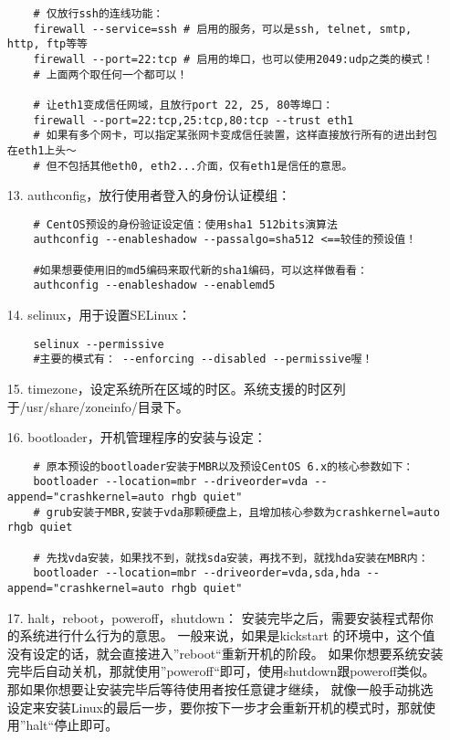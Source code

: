 \documentclass[a4paper,left=1.5cm,right=1.5cm,11pt]{article}
\begin{document}
\begin{itemize}
\begin{lstlisting}
	# 仅放行ssh的连线功能： 
	firewall --service=ssh # 启用的服务，可以是ssh, telnet, smtp, http, ftp等等 
	firewall --port=22:tcp # 启用的埠口，也可以使用2049:udp之类的模式！ 
	# 上面两个取任何一个都可以！

	# 让eth1变成信任网域，且放行port 22, 25, 80等埠口： 
	firewall --port=22:tcp,25:tcp,80:tcp --trust eth1
	# 如果有多个网卡，可以指定某张网卡变成信任装置，这样直接放行所有的进出封包在eth1上头～ 
	# 但不包括其他eth0, eth2...介面，仅有eth1是信任的意思。
		\end{lstlisting}

		\item[13.] authconfig，放行使用者登入的身份认证模组：
		\begin{lstlisting}
	# CentOS预设的身份验证设定值：使用sha1 512bits演算法
	authconfig --enableshadow --passalgo=sha512 <==较佳的预设值！ 

	#如果想要使用旧的md5编码来取代新的sha1编码，可以这样做看看： 
	authconfig --enableshadow --enablemd5
		\end{lstlisting}

		\item[14.] selinux，用于设置SELinux：
		\begin{lstlisting}
	selinux --permissive
	#主要的模式有： --enforcing --disabled --permissive喔！
		\end{lstlisting}

		\item[15.] timezone，设定系统所在区域的时区。系统支援的时区列于/usr/share/zoneinfo/目录下。
		\item[16.] bootloader，开机管理程序的安装与设定：
		\begin{lstlisting}
	# 原本预设的bootloader安装于MBR以及预设CentOS 6.x的核心参数如下：
	bootloader --location=mbr --driveorder=vda --append="crashkernel=auto rhgb quiet" 
	# grub安装于MBR,安装于vda那颗硬盘上，且增加核心参数为crashkernel=auto rhgb quiet 

	# 先找vda安装，如果找不到，就找sda安装，再找不到，就找hda安装在MBR内： 
	bootloader --location=mbr --driveorder=vda,sda,hda --append="crashkernel=auto rhgb quiet"
		\end{lstlisting}

		\item[17.] halt，reboot，poweroff，shutdown：
		安装完毕之后，需要安装程式帮你的系统进行什么行为的意思。 
		一般来说，如果是kickstart 的环境中，这个值没有设定的话，就会直接进入”reboot“重新开机的阶段。 
		如果你想要系统安装完毕后自动关机，那就使用”poweroff“即可，使用shutdown跟poweroff类似。 
		那如果你想要让安装完毕后等待使用者按任意键才继续， 就像一般手动挑选设定来安装Linux的最后一步，要你按下一步才会重新开机的模式时，那就使用”halt“停止即可。 


\end{itemize}
\end{document}
